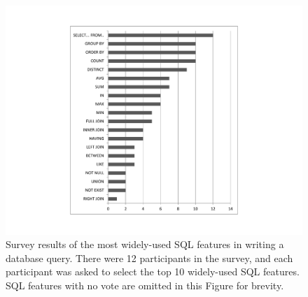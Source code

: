 
\begin{figure}[t]
  \centering
  \includegraphics[scale=0.45]{survey}
  \vspace*{-3.0ex}\caption {{\label{fig:survey}
  Survey results of the most widely-used SQL features
  in writing a database query. There were 12 participants
  in the survey, and each participant was asked to
  select the top 10 widely-used SQL features.
  SQL features with no vote are omitted in this Figure
  for brevity.
}}
\end{figure}

\newcommand{\q}{\langle query\rangle}
\newcommand{\db}{\langle db\rangle}
\newcommand{\pat}{\langle pat\rangle}
\newcommand{\bug}{\langle bug\rangle}
\newcommand{\dist}{\langle distance\rangle}
\newcommand{\sem}[1]{\llbracket #1\rrbracket}
\newcommand{\lit}[1]{\texttt{#1}}

\newcommand{\column}{\langle column\rangle}
\newcommand{\dbtable}{\langle table\rangle}
\newcommand{\cond}{\langle cond\rangle}
\newcommand{\op}{\langle op\rangle}
\newcommand{\e}{\langle expr\rangle}
\newcommand{\ce}{\langle cexpr\rangle}


